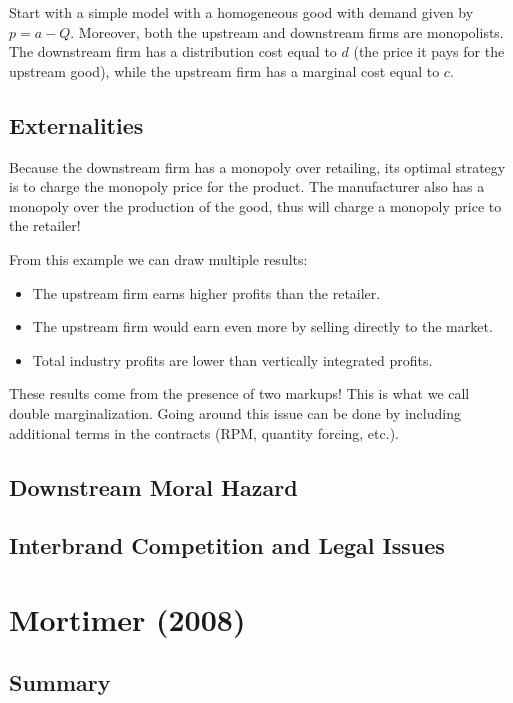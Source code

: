 Start with a simple model with a homogeneous good with demand given by $p = a - Q$. Moreover, both the upstream and downstream firms are monopolists. The downstream firm has a distribution cost equal to $d$ (the price it pays for the upstream good), while the upstream firm has a marginal cost equal to $c$.

\subsection{Externalities}

Because the downstream firm has a monopoly over retailing, its optimal strategy is to charge the monopoly price for the product. The manufacturer also has a monopoly over the production of the good, thus will charge a monopoly price to the retailer! 

From this example we can draw multiple results: \begin{itemize}
\item The upstream firm earns higher profits than the retailer.
\item The upstream firm would earn even more by selling directly to the market.
\item Total industry profits are lower than vertically integrated profits.
\end{itemize}
These results come from the presence of two markups! This is what we call double marginalization. Going around this issue can be done by including additional terms in the contracts (RPM, quantity forcing, etc.).

\subsection{Downstream Moral Hazard}



\subsection{Interbrand Competition and Legal Issues}



\section{Mortimer (2008)}

\subsection{Summary}

